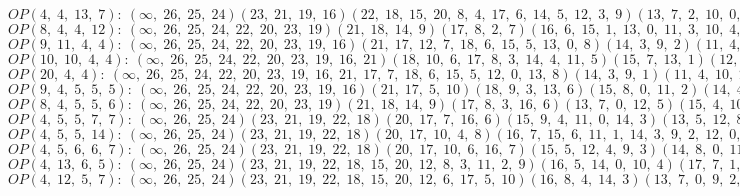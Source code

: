 $OP(4, \;4, \;13, \;7): \:(\infty, \;26, \;25, \;24)(23, \;21, \;19, \;16)(22, \;18, \;15, \;20, \;8, \;4, \;17, \;6, \;14, \;5, \;12, \;3, \;9)(13, \;7, \;2, \;10, \;0, \;11, \;1)$\\
$OP(8, \;4, \;4, \;12): \:(\infty, \;26, \;25, \;24, \;22, \;20, \;23, \;19)(21, \;18, \;14, \;9)(17, \;8, \;2, \;7)(16, \;6, \;15, \;1, \;13, \;0, \;11, \;3, \;10, \;4, \;12, \;5)$\\
$OP(9, \;11, \;4, \;4): \:(\infty, \;26, \;25, \;24, \;22, \;20, \;23, \;19, \;16)(21, \;17, \;12, \;7, \;18, \;6, \;15, \;5, \;13, \;0, \;8)(14, \;3, \;9, \;2)(11, \;4, \;10, \;1)$\\
$OP(10, \;10, \;4, \;4): \:(\infty, \;26, \;25, \;24, \;22, \;20, \;23, \;19, \;16, \;21)(18, \;10, \;6, \;17, \;8, \;3, \;14, \;4, \;11, \;5)(15, \;7, \;13, \;1)(12, \;2, \;9, \;0)$\\
$OP(20, \;4, \;4): \:(\infty, \;26, \;25, \;24, \;22, \;20, \;23, \;19, \;16, \;21, \;17, \;7, \;18, \;6, \;15, \;5, \;12, \;0, \;13, \;8)(14, \;3, \;9, \;1)(11, \;4, \;10, \;2)$\\
$OP(9, \;4, \;5, \;5, \;5): \:(\infty, \;26, \;25, \;24, \;22, \;20, \;23, \;19, \;16)(21, \;17, \;5, \;10)(18, \;9, \;3, \;13, \;6)(15, \;8, \;0, \;11, \;2)(14, \;4, \;12, \;7, \;1)$\\
$OP(8, \;4, \;5, \;5, \;6): \:(\infty, \;26, \;25, \;24, \;22, \;20, \;23, \;19)(21, \;18, \;14, \;9)(17, \;8, \;3, \;16, \;6)(13, \;7, \;0, \;12, \;5)(15, \;4, \;10, \;2, \;11, \;1)$\\
$OP(4, \;5, \;5, \;7, \;7): \:(\infty, \;26, \;25, \;24)(23, \;21, \;19, \;22, \;18)(20, \;17, \;7, \;16, \;6)(15, \;9, \;4, \;11, \;0, \;14, \;3)(13, \;5, \;12, \;8, \;2, \;10, \;1)$\\
$OP(4, \;5, \;5, \;14): \:(\infty, \;26, \;25, \;24)(23, \;21, \;19, \;22, \;18)(20, \;17, \;10, \;4, \;8)(16, \;7, \;15, \;6, \;11, \;1, \;14, \;3, \;9, \;2, \;12, \;0, \;13, \;5)$\\
$OP(4, \;5, \;6, \;6, \;7): \:(\infty, \;26, \;25, \;24)(23, \;21, \;19, \;22, \;18)(20, \;17, \;10, \;6, \;16, \;7)(15, \;5, \;12, \;4, \;9, \;3)(14, \;8, \;0, \;11, \;2, \;13, \;1)$\\
$OP(4, \;13, \;6, \;5): \:(\infty, \;26, \;25, \;24)(23, \;21, \;19, \;22, \;18, \;15, \;20, \;12, \;8, \;3, \;11, \;2, \;9)(16, \;5, \;14, \;0, \;10, \;4)(17, \;7, \;1, \;13, \;6)$\\
$OP(4, \;12, \;5, \;7): \:(\infty, \;26, \;25, \;24)(23, \;21, \;19, \;22, \;18, \;15, \;20, \;12, \;6, \;17, \;5, \;10)(16, \;8, \;4, \;14, \;3)(13, \;7, \;0, \;9, \;2, \;11, \;1)$\\
